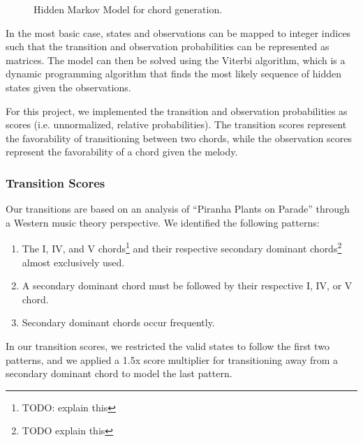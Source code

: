 \begin{figure}
    \centering
    \caption{Hidden Markov Model for chord generation.}
    \label{fig:hmm}
\end{figure}

In the most basic case, states and observations can be mapped to integer indices such that the transition and observation probabilities can be represented as matrices. The model can then be solved using the Viterbi \autocite{HMM:2023} algorithm, which is a dynamic programming algorithm that finds the most likely sequence of hidden states given the observations.

For this project, we implemented the transition and observation probabilities as scores (i.e. unnormalized, relative probabilities). The transition scores represent the favorability of transitioning between two chords, while the observation scores represent the favorability of a chord given the melody.

\subsubsection{Transition Scores}

Our transitions are based on an analysis of ``Piranha Plants on Parade'' through a Western music theory perspective. We identified the following patterns:
\begin{enumerate}
    \item The I, IV, and V chords\footnote{TODO: explain this} and their respective secondary dominant chords\footnote{TODO explain this} almost exclusively used.
    \item A secondary dominant chord must be followed by their respective I, IV, or V chord.
    \item Secondary dominant chords occur frequently.
\end{enumerate}
In our transition scores, we restricted the valid states to follow the first two patterns, and we applied a 1.5x score multiplier for transitioning away from a secondary dominant chord to model the last pattern.

